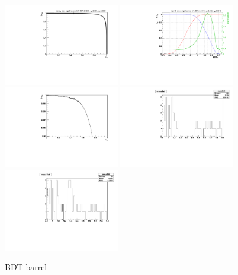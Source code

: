 \begin{figure}
  \centering
  \includegraphics[width=0.45\textwidth]{Figures/bdt/BDT_barrel_roc}
  \includegraphics[width=0.45\textwidth]{Figures/bdt/BDT_barrel_eff} 
  \includegraphics[width=0.45\textwidth]{Figures/bdt/BDT_barrel_roc_zoom}
  \includegraphics[width=0.45\textwidth]{Figures/bdt/BDT_barrel_mass}
  \includegraphics[width=0.45\textwidth]{Figures/bdt/BDT_barrel_mass_unblind}
\caption{BDT barrel}
\end{figure}


